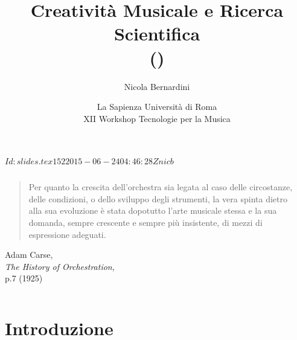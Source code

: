 \documentclass[compress]{beamer}
\title[Creativit\`a Musicale e Ricerca Scientifica]
{%
    Creativit\`a Musicale e Ricerca Scientifica\\
	{\tiny (\rcstag)}
}
\author{%
	Nicola Bernardini\\
    \href{mailto:\cpholderemail}{\cpholderemail}
}
\institute[SMERM]%
{%
	\href{http://www.conservatoriosantacecilia.it}
		 {Conservatorio di Musica ``S.Cecilia'' -- Roma}
}
\date[Roma, 24/06/2015]{La Sapienza Universit\`a di Roma\\XII Workshop Tecnologie per la Musica}
\begin{document}
\svnInfo $Id: slides.tex 152 2015-06-24 04:46:28Z nicb $
  
\begin{frame}
	\titlepage
\end{frame}

\begin{frame}
    
    \begin{columns}[T]
        \begin{column}{0.7\textwidth}
			    \begin{quote}
			        Per quanto la crescita dell'orchestra sia legata al caso delle
			        circostanze, delle condizioni, o dello sviluppo degli strumenti,
			        la vera spinta dietro alla sua evoluzione \`e stata dopotutto l'arte
			        musicale stessa e la sua domanda, sempre crescente e sempre pi\`u insistente,
			        di mezzi di espressione adeguati.%
			    \end{quote}
			    \begin{flushright}
			        Adam Carse,\\\emph{The History of Orchestration},\\p.7 (1925)
			    \end{flushright}
        \end{column}
        \begin{column}{0.3\textwidth}
            \begin{center}
            \end{center}
        \end{column}
    \end{columns}

\end{frame}
  
\section{Introduzione}
\end{document}
